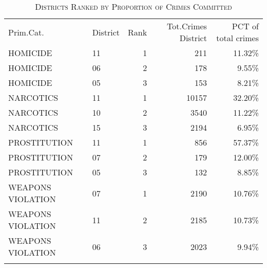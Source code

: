 \documentclass[a4paper]{article}
\begin{document}
\begin{table}[!htbp] \centering 
\begin{adjustwidth}{1.25cm}{-0cm}
\begin{threeparttable}
\small
\captionsetup{font=small, justification=raggedright,singlelinecheck=false}
\caption{\textsc{Districts Ranked by Proportion of Crimes Committed}}
\centering 
  \label{}
\small 
\begin{tabular}{@{\extracolsep{10pt}}llrrr} 
\\[-5.8ex]\hline 
\hline \\[-1.8ex] 
\toprule
  Prim.Cat. & District &  Rank &  Tot.Crimes District &  PCT of total crimes \\
\midrule
         HOMICIDE &       11 &                     1 &                          211 &                   11.32\% \\
         HOMICIDE &       06 &                     2 &                          178 &                    9.55\% \\
         HOMICIDE &       05 &                     3 &                          153 &                    8.21\% \\
        NARCOTICS &       11 &                     1 &                        10157 &                   32.20\% \\
        NARCOTICS &       10 &                     2 &                         3540 &                   11.22\% \\
        NARCOTICS &       15 &                     3 &                         2194 &                    6.95\% \\
     PROSTITUTION &       11 &                     1 &                          856 &                   57.37\% \\
     PROSTITUTION &       07 &                     2 &                          179 &                   12.00\% \\
     PROSTITUTION &       05 &                     3 &                          132 &                    8.85\% \\
WEAPONS VIOLATION &       07 &                     1 &                         2190 &                   10.76\% \\
WEAPONS VIOLATION &       11 &                     2 &                         2185 &                   10.73\% \\
WEAPONS VIOLATION &       06 &                     3 &                         2023 &                    9.94\% \\
\bottomrule
\hline 
\hline \\[-3.5ex] 
\end{tabular} 
\begin{tablenotes}
      \small
      \item\textit{ }
    \end{tablenotes}
\end{threeparttable}
\end{adjustwidth}
%
\end{table}
\end{document}
